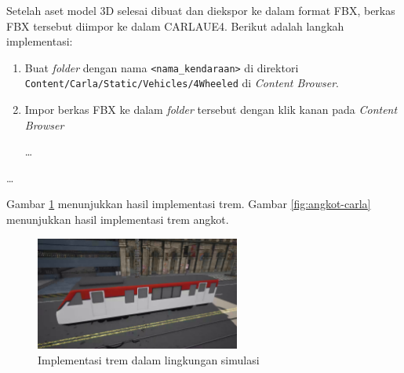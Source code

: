 Setelah aset model 3D selesai dibuat dan diekspor ke dalam format FBX, berkas
FBX tersebut diimpor ke dalam CARLAUE4. Berikut adalah langkah implementasi:

\begin{enumerate}

    \item Buat \textit{folder} dengan nama \verb|<nama_kendaraan>| di direktori
    \verb|Content/Carla/Static/Vehicles/4Wheeled| di \textit{Content Browser}.
    \item Impor berkas FBX ke dalam \textit{folder} tersebut dengan klik kanan
    pada \textit{Content Browser}

    \dots

\end{enumerate}

\dots







Gambar \ref{fig:tram-carla} menunjukkan hasil implementasi trem. Gambar
\ref{fig:angkot-carla} menunjukkan hasil implementasi trem  angkot.

\begin{figure}[!h]
    \centering
    \includegraphics[width=0.6\textwidth]{resources/chapter-4/tram-carla.png}
    \caption{Implementasi trem dalam lingkungan simulasi}
    \label{fig:tram-carla}
\end{figure}

